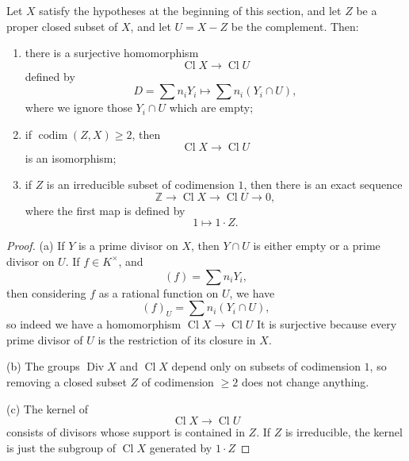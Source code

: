 \documentclass[12pt]{article}
\begin{document}
\begin{proposition}
    Let $X$ satisfy the hypotheses at the beginning of this section, and let $Z$ be a proper closed subset of $X$, and let $U=X-Z$ be the complement.
    Then:
    \begin{enumerate}
        \item[(a)] there is a surjective homomorphism
              \[
                  \operatorname{Cl} X \to \operatorname{Cl} U
              \]
              defined by
              \[
                  D=\sum n_i Y_i \longmapsto \sum n_i (Y_i \cap U),
              \]
              where we ignore those $Y_i \cap U$ which are empty;

        \item[(b)] if $\operatorname{codim}(Z,X)\ge 2$, then
              \[
                  \operatorname{Cl} X \to \operatorname{Cl} U
              \]
              is an isomorphism;

        \item[(c)] if $Z$ is an irreducible subset of codimension $1$, then there is an exact sequence
              \[
                  \mathbb Z \longrightarrow \operatorname{Cl} X \longrightarrow \operatorname{Cl} U \longrightarrow 0,
              \]
              where the first map is defined by
              \[
                  1 \longmapsto 1\cdot Z.
              \]
    \end{enumerate}
\end{proposition}

\begin{proof}
    \textup{(a)} If $Y$ is a prime divisor on $X$, then $Y\cap U$ is either empty or a prime divisor on $U$. If $f\in K^\times$, and
    \[
        (f)=\sum n_i Y_i,
    \]
    then considering $f$ as a rational function on $U$, we have
    \[
        (f)_U=\sum n_i (Y_i\cap U),
    \]
    so indeed we have a homomorphism
    $\operatorname{Cl} X \to \operatorname{Cl} U$
    It is surjective because every prime divisor of $U$ is the restriction of its closure in $X$.

    \textup{(b)} The groups $\operatorname{Div} X$ and $\operatorname{Cl} X$ depend only on subsets of codimension $1$, so removing a closed subset $Z$ of codimension $\ge 2$ does not change anything.

    \textup{(c)} The kernel of
    \[
        \operatorname{Cl} X \to \operatorname{Cl} U
    \]
    consists of divisors whose support is contained in $Z$. If $Z$ is irreducible, the kernel is just the subgroup of $\operatorname{Cl} X$ generated by $1\cdot Z$
\end{proof}
\end{document}
